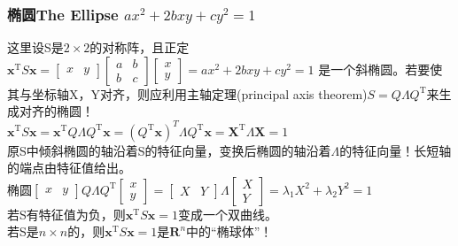     \subsubsection{椭圆The Ellipse $a x^{2}+2 b x y+c y^{2}=1$}
    这里设S是$2\times 2$的对称阵，且正定\\
    $\boldsymbol{x}^{\mathrm{T}} S \boldsymbol{x}=\left[\begin{array}{ll}{x} & {y}\end{array}\right]\left[\begin{array}{ll}{a} & {b} \\ {b} & {c}\end{array}\right]\left[\begin{array}{l}{x} \\ {y}\end{array}\right]=a x^{2}+2 b x y+c y^{2}=1$
    是一个斜椭圆。若要使其与坐标轴X，Y对齐，则应利用主轴定理(principal axis theorem)$S=Q \Lambda Q^{\mathrm{T}}$来生成对齐的椭圆！\\
    $\boldsymbol{x}^{\mathrm{T}} S \boldsymbol{x} = \boldsymbol{x}^{\mathrm{T}}Q \Lambda Q^{\mathrm{T}}\boldsymbol{x}= (Q^{\mathrm{T}}\boldsymbol{x})^{T}\Lambda Q^{\mathrm{T}}\boldsymbol{x}=\boldsymbol{X}^{\mathrm{T}} \Lambda \boldsymbol{X}=1$\\
    原S中倾斜椭圆的轴沿着S的特征向量，变换后椭圆的轴沿着$\Lambda$的特征向量！长短轴的端点由特征值给出。
    \\
    椭圆$\left[\begin{array}{ll}{x} & {y}\end{array}\right] Q \Lambda Q^{\mathrm{T}}\left[\begin{array}{l}{x} \\ {y}\end{array}\right]=\left[\begin{array}{ll}{X} & {Y}\end{array}\right] \Lambda\left[\begin{array}{l}{X} \\ {Y}\end{array}\right]=\lambda_{1} X^{2}+\lambda_{2} Y^{2}=1$
    \\
    若S有特征值为负，则$\boldsymbol{x}^{\mathrm{T}} S \boldsymbol{x}=1$变成一个双曲线。\\
    若S是$n \times n$的，则$\boldsymbol{x}^{\mathrm{T}} S \boldsymbol{x}=1$是$\mathbf{R}^{n}$中的“椭球体”！
    
